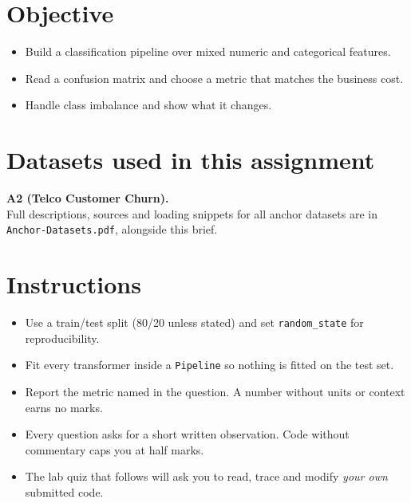 \documentclass[11pt,a4paper]{article}
\begin{document}

\section*{Objective}

\begin{itemize}[leftmargin=*]

  \item Build a classification pipeline over mixed numeric and categorical features.

  \item Read a confusion matrix and choose a metric that matches the business cost.

  \item Handle class imbalance and show what it changes.

\end{itemize}

\section*{Datasets used in this assignment}

\textbf{A2 (Telco Customer Churn).}\\ Full descriptions, sources and loading snippets for all anchor datasets are in \texttt{Anchor-Datasets.pdf}, alongside this brief.

\section*{Instructions}

\begin{itemize}[leftmargin=*]

  \item Use a train/test split (80/20 unless stated) and set \texttt{random\_state} for reproducibility.

  \item Fit every transformer inside a \texttt{Pipeline} so nothing is fitted on the test set.

  \item Report the metric named in the question. A number without units or context earns no marks.

  \item Every question asks for a short written observation. Code without commentary caps you at half marks.

  \item The lab quiz that follows will ask you to read, trace and modify \emph{your own} submitted code.

\end{itemize}
\end{document}
